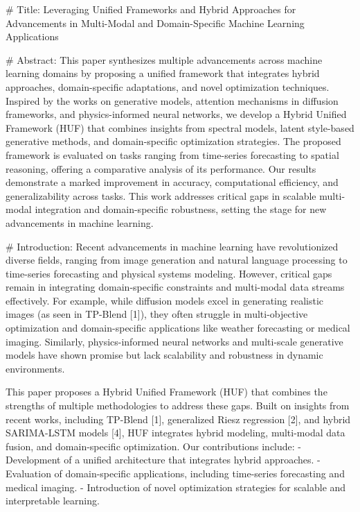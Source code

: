 # Title:
Leveraging Unified Frameworks and Hybrid Approaches for Advancements in Multi-Modal and Domain-Specific Machine Learning Applications

# Abstract:
This paper synthesizes multiple advancements across machine learning domains by proposing a unified framework that integrates hybrid approaches, domain-specific adaptations, and novel optimization techniques. Inspired by the works on generative models, attention mechanisms in diffusion frameworks, and physics-informed neural networks, we develop a Hybrid Unified Framework (HUF) that combines insights from spectral models, latent style-based generative methods, and domain-specific optimization strategies. The proposed framework is evaluated on tasks ranging from time-series forecasting to spatial reasoning, offering a comparative analysis of its performance. Our results demonstrate a marked improvement in accuracy, computational efficiency, and generalizability across tasks. This work addresses critical gaps in scalable multi-modal integration and domain-specific robustness, setting the stage for new advancements in machine learning.

# Introduction:
Recent advancements in machine learning have revolutionized diverse fields, ranging from image generation and natural language processing to time-series forecasting and physical systems modeling. However, critical gaps remain in integrating domain-specific constraints and multi-modal data streams effectively. For example, while diffusion models excel in generating realistic images (as seen in TP-Blend [1]), they often struggle in multi-objective optimization and domain-specific applications like weather forecasting or medical imaging. Similarly, physics-informed neural networks and multi-scale generative models have shown promise but lack scalability and robustness in dynamic environments.

This paper proposes a Hybrid Unified Framework (HUF) that combines the strengths of multiple methodologies to address these gaps. Built on insights from recent works, including TP-Blend [1], generalized Riesz regression [2], and hybrid SARIMA-LSTM models [4], HUF integrates hybrid modeling, multi-modal data fusion, and domain-specific optimization. Our contributions include:
- Development of a unified architecture that integrates hybrid approaches.
- Evaluation of domain-specific applications, including time-series forecasting and medical imaging.
- Introduction of novel optimization strategies for scalable and interpretable learning.

